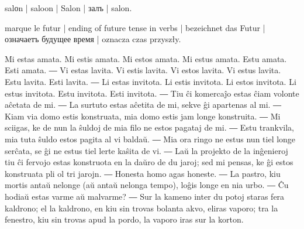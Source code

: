 \begin{ekzvocab}{1em}
 salоn | saloon | Salon | залъ | salon.

 marque le futur | ending of future tense in verbs | bezeichnet das Futur | означаетъ будущее время | oznacza czas przyszły.

\end{ekzvocab}



Mi estas amata. Mi estis amata. Mi estos amata. Mi estus amata. Estu amata. Esti amata. ― Vi estas lavita. Vi estis lavita. Vi estos lavita. Vi estus lavita. Estu lavita. Esti lavita. ― Li estas invitota. Li estis invitota. Li estos invitota. Li estus invitota. Estu invitota. Esti invitota. ― Tiu ĉi komercaĵo estas ĉiam volonte aĉetata de mi. ― La surtuto estas aĉetita de mi, sekve ĝi apartenas al mi. ― Kiam via domo estis konstruata, mia domo estis jam longe konstruita. ― Mi sciigas, ke de nun la ŝuldoj de mia filo ne estos pagataj de mi. ― Estu trankvila, mia tuta ŝuldo estos pagita al vi baldaŭ. ― Mia ora ringo ne estus nun tiel longe serĉata, se ĝi ne estus tiel lerte kaŝita de vi. ― Laŭ la projekto de la inĝenieroj tiu ĉi fervojo estas konstruota en la daŭro de du jaroj; sed mi pensas, ke ĝi estos konstruata pli ol tri jarojn. ― Honesta homo agas honeste. ― La pastro, kiu mortis antaŭ nelonge (aŭ antaŭ nelonga tempo), loĝis longe en nia urbo. ― Ĉu hodiaŭ estas varme aŭ malvarme? ― Sur la kameno inter du potoj staras fera kaldrono; el la kaldrono, en kiu sin trovas bolanta akvo, eliras vaporo; tra la fenestro, kiu sin trovas apud la pordo, la vaporo iras sur la korton.

